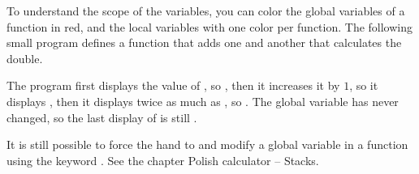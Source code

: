 \documentclass[11pt,class=report,crop=false]{standalone}
\begin{document}
\begin{cours}
\begin{itemize}
\end{itemize}


To understand the scope of the variables, you can color the global variables of a function in red, and the local variables with one color per function.
The following small program defines a function that adds one and another that calculates the double.


The program first displays the value of , so , then it increases it by $1$, so it displays , then it displays twice as much as , so . The global variable  has never changed, so the last display of  is still .

\bigskip

It is still possible to force the hand to \Python{} and modify a global variable in a function using the keyword . See the chapter \og{}Polish calculator -- Stacks\fg{}.

\end{cours}
\end{document}
